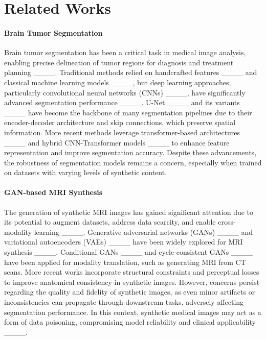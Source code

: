 \section{Related Works}
\paragraph{Brain Tumor Segmentation}  
Brain tumor segmentation has been a critical task in medical image analysis, enabling precise delineation of tumor regions for diagnosis and treatment planning ____. Traditional methods relied on handcrafted features ____ and classical machine learning models ____, but deep learning approaches, particularly convolutional neural networks (CNNs) ____, have significantly advanced segmentation performance ____. U-Net ____ and its variants ____ have become the backbone of many segmentation pipelines due to their encoder-decoder architecture and skip connections, which preserve spatial information. More recent methods leverage transformer-based architectures ____ and hybrid CNN-Transformer models ____ to enhance feature representation and improve segmentation accuracy. Despite these advancements, the robustness of segmentation models remains a concern, especially when trained on datasets with varying levels of synthetic content.

\paragraph{GAN-based MRI Synthesis}  
The generation of synthetic MRI images has gained significant attention due to its potential to augment datasets, address data scarcity, and enable cross-modality learning ____. Generative adversarial networks (GANs) ____ and variational autoencoders (VAEs) ____ have been widely explored for MRI synthesis ____. Conditional GANs ____ and cycle-consistent GANs ____ have been applied for modality translation, such as generating MRI from CT scans. More recent works incorporate structural constraints and perceptual losses to improve anatomical consistency in synthetic images. However, concerns persist regarding the quality and fidelity of synthetic images, as even minor artifacts or inconsistencies can propagate through downstream tasks, adversely affecting segmentation performance. In this context, synthetic medical images may act as a form of data poisoning, compromising model reliability and clinical applicability ____.

